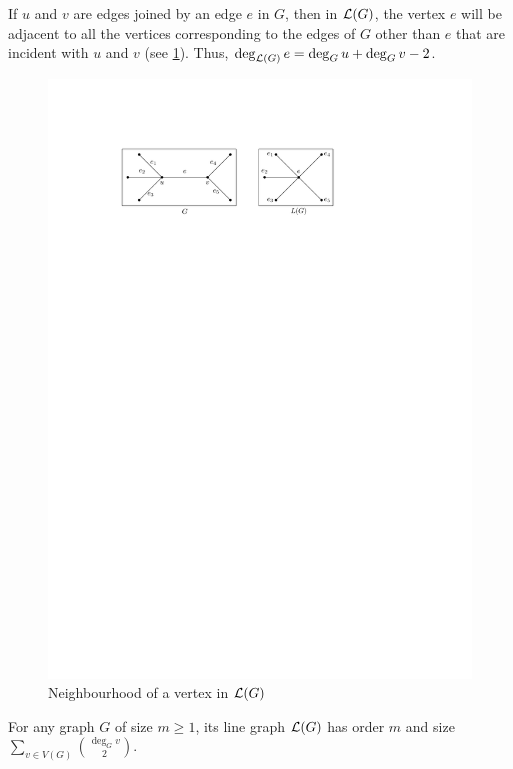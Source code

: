 If $u$ and $v$ are edges joined by an edge $e$ in $G$, then in $\operatorname{\mathcal L}(G)$, the vertex $e$ will be adjacent to all the vertices corresponding to the edges of $G$ other than $e$ that are incident with $u$ and $v$ (see \cref{fig:L(G)Neighbourhood}). Thus, $\deg_{\operatorname{\mathcal L}(G)} e = \deg_G u + \deg_G v - 2$.
\begin{figure}[!htbp]
\centering
\includegraphics{Images/L(G)Neighbourhood.pdf}
\caption{Neighbourhood of a vertex in $\operatorname{\mathcal L}(G)$}
\label{fig:L(G)Neighbourhood}
\end{figure}

\begin{Theorem}
For any graph $G$ of size $m \ge 1$, its line graph $\operatorname{\mathcal L}(G)$ has order $m$ and size $\displaystyle\sum_{v \in V(G)} \binom{\deg_G v}{2}$.
\end{Theorem}

